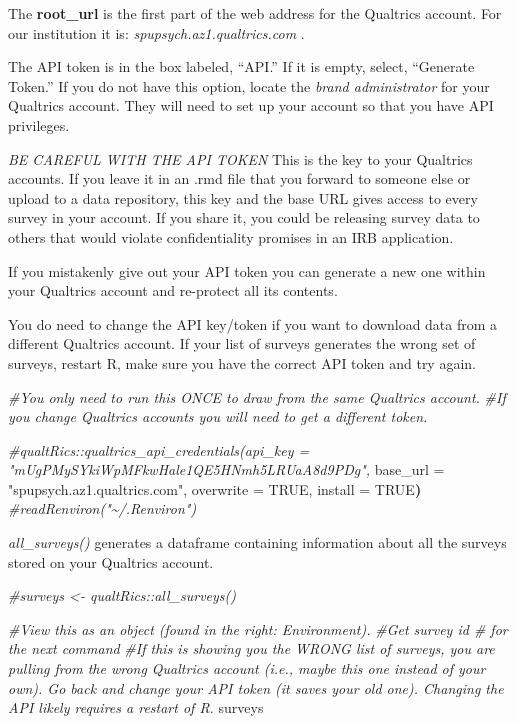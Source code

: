 \documentclass[
  11pt,
]{book}
\newenvironment{Shaded}{\begin{snugshade}}{\end{snugshade}}
\newcommand{\CommentTok}[1]{\textcolor[rgb]{0.37,0.37,0.37}{\textit{#1}}}
\newcommand{\ConstantTok}[1]{\textcolor[rgb]{0.37,0.37,0.37}{#1}}
\newcommand{\ErrorTok}[1]{\textcolor[rgb]{0.14,0.14,0.14}{\textbf{#1}}}
\newcommand{\NormalTok}[1]{#1}
\newcommand{\OtherTok}[1]{\textcolor[rgb]{0.37,0.37,0.37}{#1}}
\newcommand{\StringTok}[1]{\textcolor[rgb]{0.5,0.5,0.5}{#1}}
\begin{document}
The \textbf{root\_url} is the first part of the web address for the Qualtrics account. For our institution it is: \emph{spupsych.az1.qualtrics.com }.

The API token is in the box labeled, ``API.'' If it is empty, select, ``Generate Token.'' If you do not have this option, locate the \emph{brand administrator} for your Qualtrics account. They will need to set up your account so that you have API privileges.

\emph{BE CAREFUL WITH THE API TOKEN} This is the key to your Qualtrics accounts. If you leave it in an .rmd file that you forward to someone else or upload to a data repository, this key and the base URL gives access to every survey in your account. If you share it, you could be releasing survey data to others that would violate confidentiality promises in an IRB application.

If you mistakenly give out your API token you can generate a new one within your Qualtrics account and re-protect all its contents.

You do need to change the API key/token if you want to download data from a different Qualtrics account. If your list of surveys generates the wrong set of surveys, restart R, make sure you have the correct API token and try again.

\begin{Shaded}
\begin{Highlighting}[]
\CommentTok{\#You only need to run this ONCE to draw from the same Qualtrics account.}
\CommentTok{\#If you change Qualtrics accounts you will need to get a different token. }

\CommentTok{\#qualtRics::qualtrics\_api\_credentials(api\_key = "mUgPMySYkiWpMFkwHale1QE5HNmh5LRUaA8d9PDg",}
\NormalTok{              base\_url }\OtherTok{=} \StringTok{"spupsych.az1.qualtrics.com"}\NormalTok{, overwrite }\OtherTok{=} \ConstantTok{TRUE}\NormalTok{, install }\OtherTok{=} \ConstantTok{TRUE}\ErrorTok{)}
\CommentTok{\#readRenviron("\textasciitilde{}/.Renviron")}
\end{Highlighting}
\end{Shaded}

\emph{all\_surveys()} generates a dataframe containing information about all the surveys stored on your Qualtrics account.

\begin{Shaded}
\begin{Highlighting}[]
\CommentTok{\#surveys \textless{}{-} qualtRics::all\_surveys() }

\CommentTok{\#View this as an object (found in the right: Environment).  }
\CommentTok{\#Get survey id \# for the next command}
\CommentTok{\#If this is showing you the WRONG list of surveys, you are pulling from the wrong Qualtrics account (i.e., maybe this one instead of your own). Go back and change your API token (it saves your old one). Changing the API likely requires a restart of R.}
\NormalTok{surveys}
\end{Highlighting}
\end{Shaded}
\end{document}
